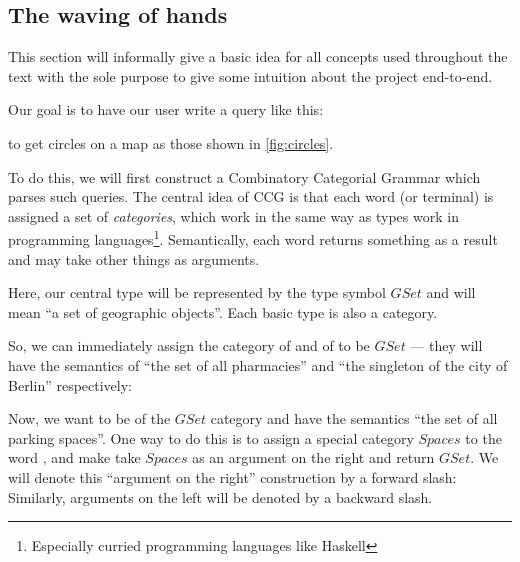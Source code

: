 \documentclass[main.tex]{subfiles}
\begin{document}
\subsection{The waving of hands}
This section will informally give a basic idea for all concepts used throughout the text
with the sole purpose to give some intuition about the project end-to-end.

Our goal is to have our user write a query like this:
\begin{center}
\end{center}
to get circles on a map as those shown in \cref{fig:circles}.


To do this, we will first construct a Combinatory Categorial Grammar which parses
such queries. The central idea of CCG is that each word (or terminal) is assigned
a set of
\emph{categories}, which work in the same way as types work in programming
languages\footnote{Especially curried programming languages like Haskell}.
Semantically, each word returns something as a result and may take other things as arguments.

Here, our central type will be represented by the type symbol
$GSet$ and will mean ``a set of geographic
objects''. Each basic type is also a category.

So, we can immediately assign the category of  and of
 to be $GSet$ --- they will have the semantics of ``the set of all
pharmacies'' and ``the singleton of the city of Berlin'' respectively:

Now, we want  to be of the $GSet$ category and have the semantics
``the set of all parking spaces''. One way to do this is to assign a special
category $Spaces$ to the word , and make  take
$Spaces$ as an argument on the right and return $GSet$. We will denote this
``argument on the right'' construction by a forward slash:
Similarly, arguments on the left will be denoted by a backward slash.
\end{document}
